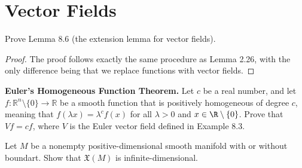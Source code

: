 \chapter{Vector Fields}

\begin{problem}
    Prove Lemma 8.6 (the extension lemma for vector fields).
    \begin{proof}
        The proof follows exactly the same procedure as Lemma 2.26, with the only difference being that we replace functions with vector fields.
    \end{proof}
\end{problem}

\begin{problem}
    \textbf{Euler's Homogeneous Function Theorem.} Let $c$ be a real number, and let $f \colon \mathbb{R}^n \setminus \{0\} \to \mathbb{R}$ be a smooth function that is positively homogeneous of degree $c$, meaning that
    $f(\lambda x) = \lambda^cf(x)$ for all $\lambda > 0$ and $x \in \R \setminus \{0\}$. Prove that $Vf=cf$, where $V$ is the Euler vector field defined in Example 8.3.
\end{problem}

\begin{problem}
    Let $M$ be a nonempty positive-dimensional smooth manifold with or without boundart. Show that $\mathfrak{X}(M)$ is infinite-dimensional.
\end{problem}